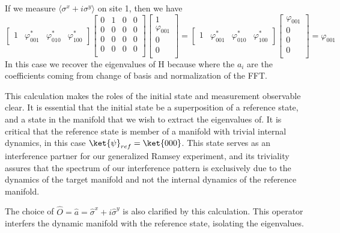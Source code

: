If we measure $\langle \sigma^x + i \sigma^y \rangle$ on site 1, then we have
\begin{equation}
\begin{bmatrix}
1 & \varphi_{001}^* & \varphi_{010}^* & \varphi_{100}^*
\end{bmatrix}
\begin{bmatrix}
0 & 1 & 0 & 0 \\
0 & 0 & 0 & 0 \\
0 & 0 & 0 & 0 \\
0 & 0 & 0 & 0 \\
\end{bmatrix}
\begin{bmatrix}
1 \\
\varphi_{001} \\
0 \\
0 \\
\end{bmatrix}
=
\begin{bmatrix}
1 & \varphi_{001}^* & \varphi_{010}^* & \varphi_{100}^*
\end{bmatrix}
\begin{bmatrix}
\varphi_{001} \\
0 \\
0 \\
0 \\
\end{bmatrix}
= \varphi_{001}
\end{equation}
In this case we recover the eigenvalues of H because 
where the $a_i$ are the coefficients coming from change of basis and normalization of the FFT.

This calculation makes the roles of the initial state and measurement observable clear.
It is essential that the initial state be a superposition of a reference state, and a state in the manifold that we wish to extract the eigenvalues of.
It is critical that the reference state is member of a manifold with trivial internal dynamics, in this case $\ket{\psi}_{ref} = \ket{000}$.
This state serves as an interference partner for our generalized Ramsey experiment,
and its triviality assures that the spectrum of our interference pattern is exclusively due to the dynamics of the target manifold and not the internal dynamics of the reference manifold.

The choice of $\hat{O} = \hat{a} = \hat{\sigma}^x + i \hat{\sigma}^y$ is also clarified by this calculation.
This operator interfers the dynamic manifold with the reference state, isolating the eigenvalues.

